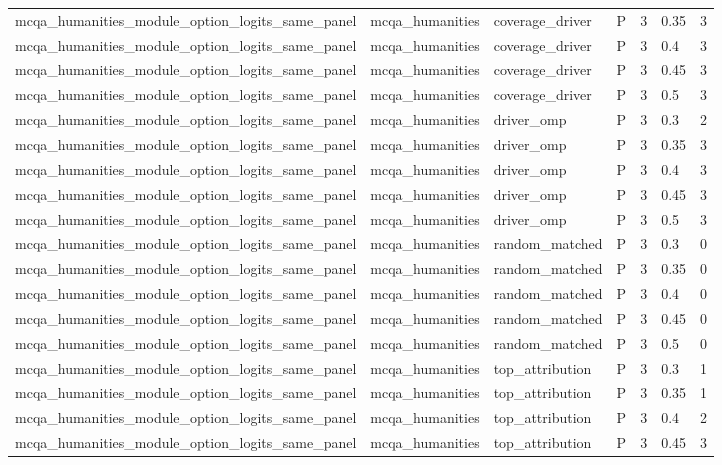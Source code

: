 \begin{tabular}{lllllll}
mcqa\_humanities\_module\_option\_logits\_same\_panel & mcqa\_humanities & coverage\_driver & P & 3 & 0.35 & 3 \\
mcqa\_humanities\_module\_option\_logits\_same\_panel & mcqa\_humanities & coverage\_driver & P & 3 & 0.4 & 3 \\
mcqa\_humanities\_module\_option\_logits\_same\_panel & mcqa\_humanities & coverage\_driver & P & 3 & 0.45 & 3 \\
mcqa\_humanities\_module\_option\_logits\_same\_panel & mcqa\_humanities & coverage\_driver & P & 3 & 0.5 & 3 \\
mcqa\_humanities\_module\_option\_logits\_same\_panel & mcqa\_humanities & driver\_omp & P & 3 & 0.3 & 2 \\
mcqa\_humanities\_module\_option\_logits\_same\_panel & mcqa\_humanities & driver\_omp & P & 3 & 0.35 & 3 \\
mcqa\_humanities\_module\_option\_logits\_same\_panel & mcqa\_humanities & driver\_omp & P & 3 & 0.4 & 3 \\
mcqa\_humanities\_module\_option\_logits\_same\_panel & mcqa\_humanities & driver\_omp & P & 3 & 0.45 & 3 \\
mcqa\_humanities\_module\_option\_logits\_same\_panel & mcqa\_humanities & driver\_omp & P & 3 & 0.5 & 3 \\
mcqa\_humanities\_module\_option\_logits\_same\_panel & mcqa\_humanities & random\_matched & P & 3 & 0.3 & 0 \\
mcqa\_humanities\_module\_option\_logits\_same\_panel & mcqa\_humanities & random\_matched & P & 3 & 0.35 & 0 \\
mcqa\_humanities\_module\_option\_logits\_same\_panel & mcqa\_humanities & random\_matched & P & 3 & 0.4 & 0 \\
mcqa\_humanities\_module\_option\_logits\_same\_panel & mcqa\_humanities & random\_matched & P & 3 & 0.45 & 0 \\
mcqa\_humanities\_module\_option\_logits\_same\_panel & mcqa\_humanities & random\_matched & P & 3 & 0.5 & 0 \\
mcqa\_humanities\_module\_option\_logits\_same\_panel & mcqa\_humanities & top\_attribution & P & 3 & 0.3 & 1 \\
mcqa\_humanities\_module\_option\_logits\_same\_panel & mcqa\_humanities & top\_attribution & P & 3 & 0.35 & 1 \\
mcqa\_humanities\_module\_option\_logits\_same\_panel & mcqa\_humanities & top\_attribution & P & 3 & 0.4 & 2 \\
mcqa\_humanities\_module\_option\_logits\_same\_panel & mcqa\_humanities & top\_attribution & P & 3 & 0.45 & 3 \\

\end{tabular}
